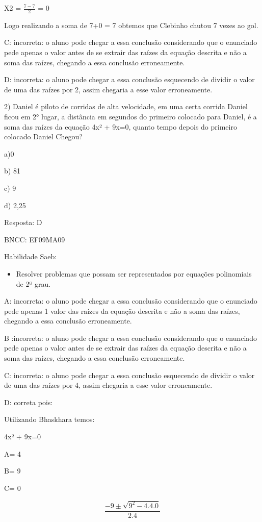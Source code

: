 X2 = \(\frac{7 - 7}{2}\) = 0

Logo realizando a soma de 7+0 = 7 obtemos que Clebinho chutou 7 vezes ao
gol.

C: incorreta: o aluno pode chegar a essa conclusão considerando que o
enunciado pede apenas o valor antes de se extrair das raízes da equação
descrita e não a soma das raízes, chegando a essa conclusão
erroneamente.

D: incorreta: o aluno pode chegar a essa conclusão esquecendo de dividir
o valor de uma das raízes por 2, assim chegaria a esse valor
erroneamente.

2) Daniel é piloto de corridas de alta velocidade, em uma certa corrida
Daniel ficou em 2° lugar, a distância em segundos do primeiro colocado
para Daniel, é a soma das raízes da equação 4x² + 9x=0, quanto tempo
depois do primeiro colocado Daniel Chegou?

a)0

b) 81

c) 9

d) 2,25

Resposta: D

BNCC: EF09MA09

Habilidade Saeb:

\begin{itemize}
\tightlist
\item
  Resolver problemas que possam ser representados por equações
  polinomiais de 2º grau.
\end{itemize}

A: incorreta: o aluno pode chegar a essa conclusão considerando que o
enunciado pede apenas 1 valor das raízes da equação descrita e não a
soma das raízes, chegando a essa conclusão erroneamente.

B :incorreta: o aluno pode chegar a essa conclusão considerando que o
enunciado pede apenas o valor antes de se extrair das raízes da equação
descrita e não a soma das raízes, chegando a essa conclusão
erroneamente.

C: incorreta: o aluno pode chegar a essa conclusão esquecendo de dividir
o valor de uma das raízes por 4, assim chegaria a esse valor
erroneamente.

D: correta pois:

Utilizando Bhaskhara temos:

4x² + 9x=0

A= 4

B= 9

C= 0

\[\frac{- 9 \pm \sqrt{9^{2} - 4.4.0}}{2.4}\]

